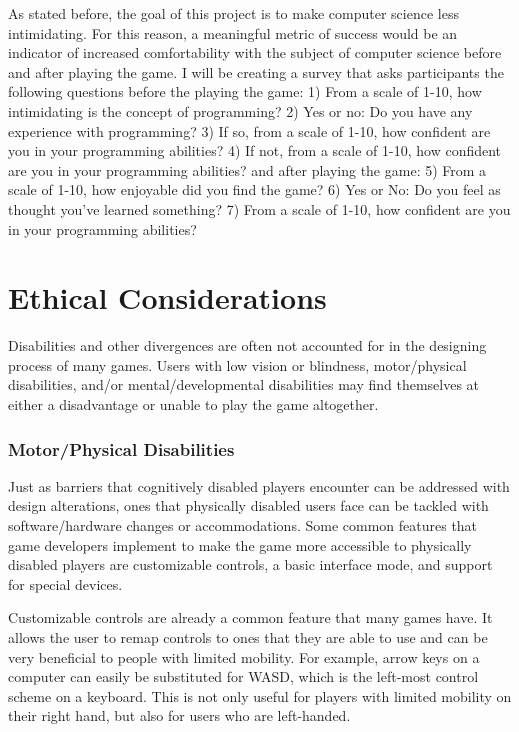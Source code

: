 \documentclass[10pt,twocolumn]{article}
\begin{document}
As stated before, the goal of this project is to make computer science less intimidating. For this reason, a meaningful metric of success would be an indicator of increased comfortability with the subject of computer science before and after playing the game. I will be creating a survey that asks participants the following questions before the playing the game:
1) From a scale of 1-10, how intimidating is the concept of programming?
2) Yes or no: Do you have any experience with programming?
3) If so, from a scale of 1-10, how confident are you in your programming abilities?
4) If not, from a scale of 1-10, how confident are you in your programming abilities?
and after playing the game:
5) From a scale of 1-10, how enjoyable did you find the game?
6) Yes or No: Do you feel as thought you've learned something?
7) From a scale of 1-10, how confident are you in your programming abilities?



\section{Ethical Considerations}

Disabilities and other divergences are often not accounted for in the designing process of many games. Users with low vision or blindness, motor/physical disabilities, and/or mental/developmental disabilities may find themselves at either a disadvantage or unable to play the game altogether.  

\subsubsection{Motor/Physical Disabilities}

Just as barriers that cognitively disabled players encounter can be addressed with design alterations, ones that physically disabled users face can be tackled with software/hardware changes or accommodations. Some common features that game developers implement to make the game more accessible to physically disabled players are customizable controls, a basic interface mode, and support for special devices. \cite{eskelinen2001gaming} 

Customizable controls are already a common feature that many games have. It allows the user to remap controls to ones that they are able to use and can be very beneficial to people with limited mobility. For example, arrow keys on a computer can easily be substituted for WASD, which is the left-most control scheme on a keyboard. This is not only useful for players with limited mobility on their right hand, but also for users who are left-handed. 
\end{document}
